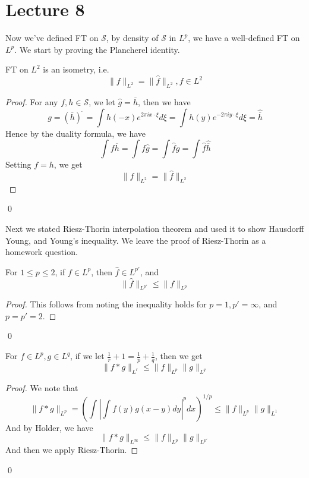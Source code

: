 \section{Lecture 8}
Now we've defined FT on $\mathcal{S}$, by density of $\mathcal{S}$ in $L^p$, we have a well-defined FT on $L^p$. We start by proving the Plancherel identity.
\begin{theorem}
    FT on $L^2$ is an isometry, i.e.
    \begin{equation*}
        \|f\|_{L^2}=\|\hat{f}\|_{L^2}, f\in L^2
    \end{equation*}
\end{theorem}
\begin{proof}
    For any $f,h\in\mathcal{S}$, we let $\hat{g}=\overline{h}$, then we have
    \begin{equation*}
        g=(\overline{h})^{\check{\phantom{.}}}=\int h(-x)e^{2\pi ix\cdot\xi}d\xi=\int h(y)e^{-2\pi iy\cdot\xi}d\xi=\hat{\overline{h}}
    \end{equation*}
    Hence by the duality formula, we have
    \begin{equation*}
        \int f\overline{h}=\int f\hat{g}=\int \hat{f}g=\int \hat{f}\hat{\overline{h}}
    \end{equation*}
    Setting $f=h$, we get
    \begin{equation*}
        \|f\|_{L^2}=\|\hat{f}\|_{L^2}
    \end{equation*}
\end{proof}
\qed

Next we stated Riesz-Thorin interpolation theorem and used it to show Hausdorff Young, and Young's inequality. We leave the proof of Riesz-Thorin as a homework question.
\begin{theorem}
    For $1\leq p\leq 2$, if $f\in L^p$, then $\hat{f}\in L^{p'}$, and 
    \begin{equation*}
        \|\hat{f}\|_{L^{p'}}\leq\|f\|_{L^p}
    \end{equation*}
\end{theorem}
\begin{proof}
    This follows from noting the inequality holds for $p=1, p'=\infty$, and $p=p'=2$.
\end{proof}
\qed

\begin{theorem}
    For $f\in L^p, g\in L^q$, if we let $\frac{1}{r}+1=\frac{1}{p}+\frac{1}{q}$, then we get
    \begin{equation*}
        \|f\ast g\|_{L^r}\leq\|f\|_{L^p}\|g\|_{L^q}
    \end{equation*}
\end{theorem}
\begin{proof}
    We note that 
    \begin{equation*}
        \|f\ast g\|_{L^p}=\left(\int\left|\int f(y)g(x-y)dy\right|^pdx\right)^{1/p}\leq\|f\|_{L^p}\|g\|_{L^1}
    \end{equation*}
    And by Holder, we have
    \begin{equation*}
        \|f\ast g\|_{L^\infty}\leq\|f\|_{L^p}\|g\|_{L^{p'}}
    \end{equation*}
    And then we apply Riesz-Thorin.
\end{proof}
\qed

